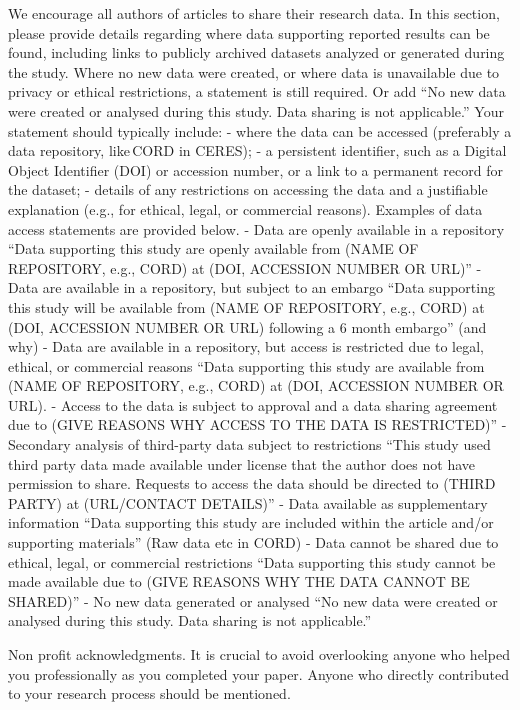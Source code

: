 \documentclass[default]{subfiles}
\begin{document}
{\begin{dataavailability}
  We encourage all authors of articles to share their research data. In this section, please provide details regarding where data supporting reported results can be found, including links to publicly archived datasets analyzed or generated during the study. Where no new data were created, or where data is unavailable due to privacy or ethical restrictions, a statement is still required. Or add ``No new data were created or analysed during this study. Data sharing is not applicable.''
Your statement should typically include: 
- where the data can be accessed (preferably a data repository, like CORD in CERES);
- a persistent identifier, such as a Digital Object Identifier (DOI) or accession number, or a link to a permanent record for the dataset;
- details of any restrictions on accessing the data and a justifiable explanation (e.g., for ethical, legal, or commercial reasons).
Examples of data access statements are provided below.
- Data are openly available in a repository “Data supporting this study are openly available from (NAME OF REPOSITORY, e.g., CORD) at (DOI, ACCESSION NUMBER OR URL)”
- Data are available in a repository, but subject to an embargo “Data supporting this study will be available from (NAME OF REPOSITORY, e.g., CORD) at (DOI, ACCESSION NUMBER OR URL) following a 6 month embargo” (and why)
- Data are available in a repository, but access is restricted due to legal, ethical, or commercial reasons “Data supporting this study are available from (NAME OF REPOSITORY, e.g., CORD) at (DOI, ACCESSION NUMBER OR URL).
- Access to the data is subject to approval and a data sharing agreement due to (GIVE REASONS WHY ACCESS TO THE DATA IS RESTRICTED)”
- Secondary analysis of third-party data subject to restrictions “This study used third party data made available under license that the author does not have permission to share. Requests to access the data should be directed to (THIRD PARTY) at (URL/CONTACT DETAILS)”
- Data available as supplementary information   “Data supporting this study are included within the article and/or supporting materials” (Raw data etc in CORD)
- Data cannot be shared due to ethical, legal, or commercial restrictions “Data supporting this study cannot be made available due to (GIVE REASONS WHY THE DATA CANNOT BE SHARED)”
- No new data generated or analysed  ``No new data were created or analysed during this study. Data sharing is not applicable.''
\end{dataavailability}

\begin{acknowledgments}
  Non profit acknowledgments.
  It is crucial to avoid overlooking anyone who helped you professionally as you completed your paper. Anyone who directly contributed to your research process should be mentioned.
\end{acknowledgments}  

}
\end{document}
